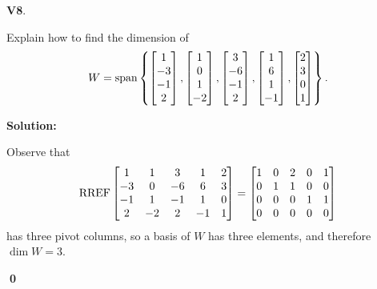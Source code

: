 \documentclass{article}
\newenvironment{problem}[1]
{
  \begin{flushleft}
  \textbf{#1}.
  \ignorespaces
}
{
  \end{flushleft}
}
\newenvironment{solution}
{
  \ignorespaces
  \textbf{Solution:}
}
{
  \ignorespacesafterend
  \begin{flushright}
  {\bfseries \qed}
  \end{flushright}
}
\begin{document}
\begin{problem}{V8}
Explain how to find the dimension of 
\[
  W = \operatorname{span} \left\{
  \begin{bmatrix} 1 \\ -3 \\ -1 \\ 2 \end{bmatrix} ,
  \begin{bmatrix} 1 \\ 0 \\ 1 \\ -2 \end{bmatrix} ,
  \begin{bmatrix} 3 \\ -6 \\ -1 \\ 2 \end{bmatrix} ,
  \begin{bmatrix} 1 \\ 6 \\ 1 \\ -1 \end{bmatrix} ,
  \begin{bmatrix} 2 \\ 3 \\ 0 \\ 1 \end{bmatrix}
  \right\} .
\]
\end{problem}
\begin{solution}
Observe that
\[ \operatorname{RREF}
    \begin{bmatrix}
    1 & 1 & 3 & 1 & 2 \\
    -3 & 0 & -6 & 6 & 3 \\
    -1 & 1 & -1 & 1 & 0 \\
    2 & -2 & 2 & -1 & 1
    \end{bmatrix} =
    \begin{bmatrix}
    1 & 0 & 2 & 0 & 1 \\
    0 & 1 & 1 & 0 & 0 \\
    0 & 0 & 0 & 1 & 1 \\
    0 & 0 & 0 & 0 & 0
    \end{bmatrix}
\]
has three pivot columns, so a basis of \(W\) has three elements, and therefore \(\dim W = 3\).
\end{solution}
\end{document}
